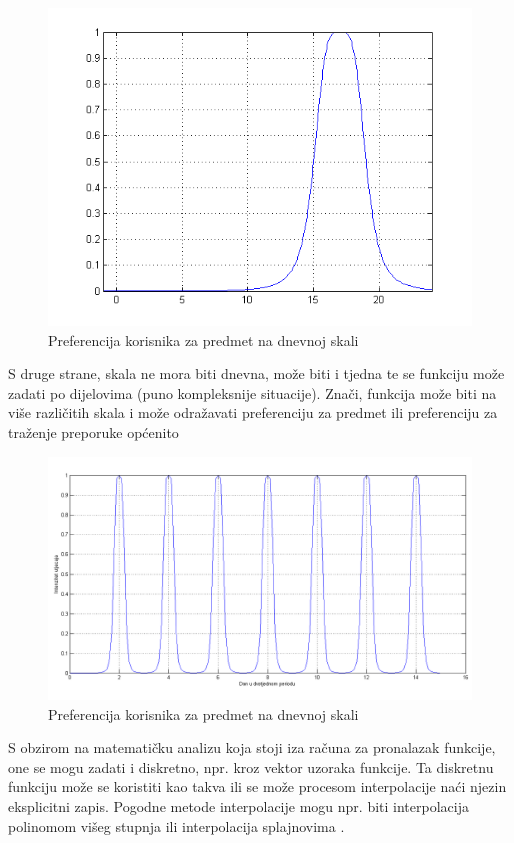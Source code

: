 \documentclass[times, utf8, diplomski, numeric]{fer}
\begin{document}
\begin{figure}[htb]
	\centering
	\includegraphics[width=12cm]{images/zvonolika1matlab.png}
	\caption{Preferencija korisnika za predmet na dnevnoj skali}
	\label{fig:Gauss1}
\end{figure}

S druge strane, skala ne mora biti dnevna, može biti i tjedna te se funkciju
može zadati po dijelovima (puno kompleksnije situacije). 
Znači, funkcija može biti na više različitih skala i može odražavati
preferenciju za predmet ili preferenciju za traženje preporuke općenito
\begin{figure}[htb]
	\centering
	\includegraphics[width=14.21cm]{images/neprigusenocropped.png}
	\caption{Preferencija korisnika za predmet na dnevnoj skali}
	\label{fig:Gauss2}
\end{figure}

S obzirom na matematičku analizu koja stoji iza računa za pronalazak funkcije,
one se mogu zadati i diskretno, npr. kroz vektor uzoraka funkcije. Ta diskretnu
funkciju može se koristiti kao takva ili se može procesom interpolacije naći
njezin eksplicitni zapis. Pogodne metode interpolacije mogu npr. biti
interpolacija polinomom višeg stupnja ili interpolacija splajnovima
.
\end{document}
